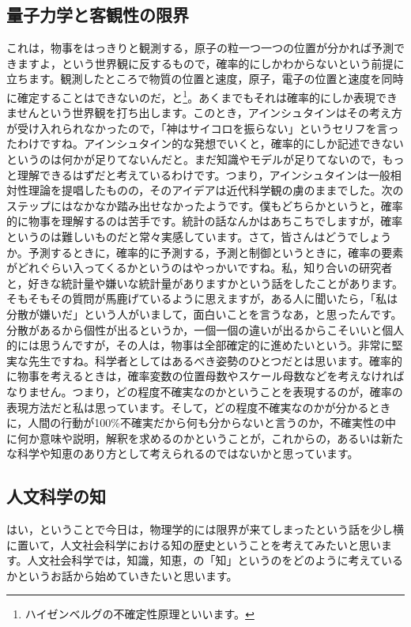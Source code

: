 \documentclass{ltjsbook}
\begin{document}
\subsection{量子力学と客観性の限界}
これは，物事をはっきりと観測する，原子の粒一つ一つの位置が分かれば予測できますよ，という世界観に反するもので，確率的にしかわからないという前提に立ちます。観測したところで物質の位置と速度，原子，電子の位置と速度を同時に確定することはできないのだ，と\footnote{ハイゼンベルグの不確定性原理といいます。}。あくまでもそれは確率的にしか表現できませんという世界観を打ち出します。このとき，アインシュタインはその考え方が受け入れられなかったので，「神はサイコロを振らない」というセリフを言ったわけですね。アインシュタイン的な発想でいくと，確率的にしか記述できないというのは何かが足りてないんだと。まだ知識やモデルが足りてないので，もっと理解できるはずだと考えているわけです。つまり，アインシュタインは一般相対性理論を提唱したものの，そのアイデアは近代科学観の虜のままでした。次のステップにはなかなか踏み出せなかったようです。僕もどちらかというと，確率的に物事を理解するのは苦手です。統計の話なんかはあちこちでしますが，確率というのは難しいものだと常々実感しています。さて，皆さんはどうでしょうか。予測するときに，確率的に予測する，予測と制御というときに，確率の要素がどれぐらい入ってくるかというのはやっかいですね。私，知り合いの研究者と，好きな統計量や嫌いな統計量がありますかという話をしたことがあります。そもそもその質問が馬鹿げているように思えますが，ある人に聞いたら，「私は分散が嫌いだ」という人がいまして，面白いことを言うなあ，と思ったんです。分散があるから個性が出るというか，一個一個の違いが出るからこそいいと個人的には思うんですが，その人は，物事は全部確定的に進めたいという。非常に堅実な先生ですね。科学者としてはあるべき姿勢のひとつだとは思います。確率的に物事を考えるときは，確率変数の位置母数やスケール母数などを考えなければなりません。つまり，どの程度不確実なのかということを表現するのが，確率の表現方法だと私は思っています。そして，どの程度不確実なのかが分かるときに，人間の行動が100\%不確実だから何も分からないと言うのか，不確実性の中に何か意味や説明，解釈を求めるのかということが，これからの，あるいは新たな科学や知恵のあり方として考えられるのではないかと思っています。

\subsection{人文科学の知}
はい，ということで今日は，物理学的には限界が来てしまったという話を少し横に置いて，人文社会科学における知の歴史ということを考えてみたいと思います。人文社会科学では，知識，知恵，の「知」というのをどのように考えているかというお話から始めていきたいと思います。
\end{document}
